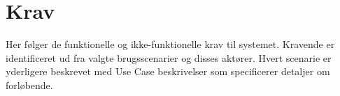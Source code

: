 \chapter{Krav}
Her følger de funktionelle og ikke-funktionelle krav til systemet. Kravende er identificeret ud fra valgte brugsscenarier og disses aktører. Hvert scenarie er yderligere beskrevet med Use Case beskrivelser som specificerer detaljer om forløbende.








